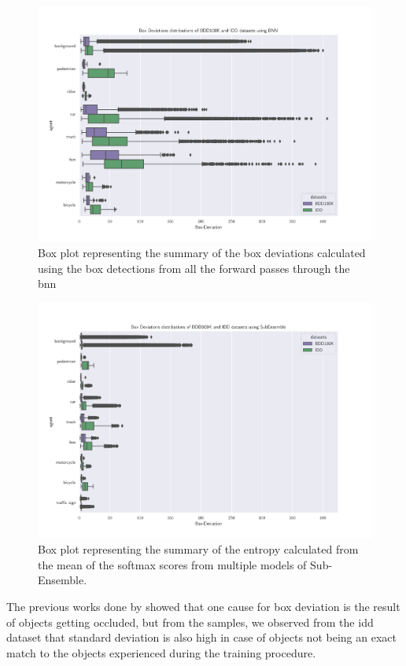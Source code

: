     \begin{figure}[H]
        \centering
        \includegraphics[scale=0.6]{images/distributions/BNN_bdd_vs_iid_deviations.png}
        \caption[Box plot of box deviations with Bayesian model]{Box plot representing the summary of the box deviations calculated using the box detections from all the forward passes through the \acrshort{bnn}}
        \label{fig:bnn_dev_summary}
    \end{figure}
    \begin{figure}[H]
        \centering
        \includegraphics[scale=0.6]{images/distributions/SubEns_bdd_vs_iid_deviations.png}
        \caption[Box plot of box deviations with Sub-Ensemble model]{Box plot representing the summary of the entropy calculated from the mean of the softmax scores from multiple models of Sub-Ensemble.}
        \label{fig:subens_dev_summary}
    \end{figure}
    The previous works done by \citet{Feng2018, Feng2019} showed that one cause for box deviation is the result of objects getting occluded, but from the samples, we observed from the \acrshort{idd} dataset that standard deviation is also high in case of objects not being an exact match to the objects experienced during the training procedure. 
    
